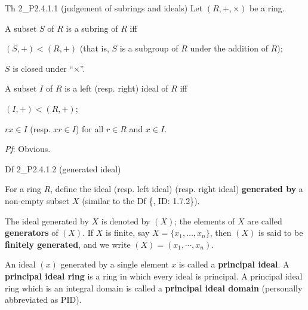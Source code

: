 \documentclass{article}
\begin{document}
\begin{Th}{Th 2\_P2.4.1.1 (judgement of subrings and ideals)}
    Let $(R, +, \times)$ be a ring.
    \begin{compactenum}
        \item A subset $S$ of $R$ is a subring of $R$ iff
        \begin{compactenum}
            \item $(S,+) < (R,+)$ (that is, $S$ is a subgroup of $R$ under the addition of $R$);
            \item $S$ is closed under ``$\times$''.
        \end{compactenum}
        \item A subset $I$ of $R$ is a left (resp. right) ideal of $R$ iff
        \begin{compactenum}
            \item $(I,+) < (R,+)$;
            \item $rx\in I$ (resp. $xr\in I$) for all $r\in R$ and $x\in I$.
        \end{compactenum}
    \end{compactenum}
    \tcblower
    \textit{Pf}: Obvious.
\end{Th}

\begin{Df}{Df 2\_P2.4.1.2 (generated ideal)}
    \begin{compactenum}
        \item For a ring $R$, define the ideal (resp. left ideal) (resp. right ideal) \textbf{generated by} a non-empty subset $X$ (similar to the Df \{, ID: 1.7.2\}).
        \item The ideal generated by $X$ is denoted by $(X)$; the elements of $X$ are called \textbf{generators} of $(X)$. If $X$ is finite, say $X = \{x_1, \dots, x_n\}$, then $(X)$ is said to be \textbf{finitely generated}, and we write $(X) = (x_1, \cdots, x_n)$. 
        \item An ideal $(x)$ generated by a single element $x$ is called a \textbf{principal ideal}. A \textbf{principal ideal ring} is a ring in which every ideal is principal. A principal ideal ring which is an integral domain is called a \textbf{principal ideal domain} (personally abbreviated as PID).
    \end{compactenum}
\end{Df}
\end{document}
